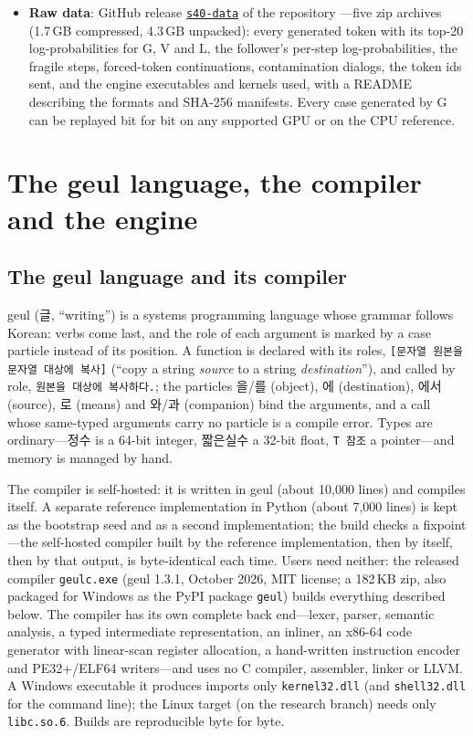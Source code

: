 \documentclass[11pt]{article}
\begin{document}
\begin{itemize}[noitemsep]
      judge), \texttt{사람확인.md} (human check).
\item \textbf{Raw data}: GitHub release \href{https://github.com/wwoosshh/GeulPU/releases/tag/s40-data}{\texttt{s40-data}} of
      the repository \citep{woo2026data}---five zip archives (1.7\,GB compressed, 4.3\,GB unpacked): every generated token with its top-20
      log-probabilities for G, V and L, the follower's per-step log-probabilities, the fragile steps, forced-token
      continuations, contamination dialogs, the token ids sent, and the engine executables and kernels used, with a README
      describing the formats and SHA-256 manifests. Every case generated by G can be replayed bit for bit on any supported
      GPU or on the CPU reference.
\end{itemize}

\section{The geul language, the compiler and the engine}\label{app:geul}

\subsection{The geul language and its compiler}

geul (글, ``writing'') is a systems programming language whose grammar follows Korean: verbs come last, and the role of
each argument is marked by a case particle instead of its position. A function is declared with its roles,
\texttt{[문자열 원본을 문자열 대상에 복사]} (``copy a string \emph{source} to a string \emph{destination}''), and called by
role, \texttt{원본을 대상에 복사하다.}; the particles 을/를 (object), 에 (destination), 에서 (source), 로 (means) and
와/과 (companion) bind the arguments, and a call whose same-typed arguments carry no particle is a compile error. Types are
ordinary---정수 is a 64-bit integer, 짧은실수 a 32-bit float, \texttt{T 참조} a pointer---and memory is managed by hand.

The compiler is self-hosted: it is written in geul (about 10,000 lines) and compiles itself. A separate reference
implementation in Python (about 7,000 lines) is kept as the bootstrap seed and as a second implementation; the build checks
a fixpoint---the self-hosted compiler built by the reference implementation, then by itself, then by that output, is
byte-identical each time. Users need neither: the released compiler \texttt{geulc.exe} (geul 1.3.1, October 2026, MIT
license; a 182\,KB zip, also packaged for Windows as the PyPI package \texttt{geul}) builds everything described below. The
compiler has its own complete back end---lexer, parser, semantic analysis, a typed intermediate representation, an inliner,
an x86-64 code generator with linear-scan register allocation, a hand-written instruction encoder and PE32+/ELF64
writers---and uses no C compiler, assembler, linker or LLVM. A Windows executable it produces imports only
\texttt{kernel32.dll} (and \texttt{shell32.dll} for the command line); the Linux target (on the research branch) needs only
\texttt{libc.so.6}. Builds are reproducible byte for byte.
\end{document}
